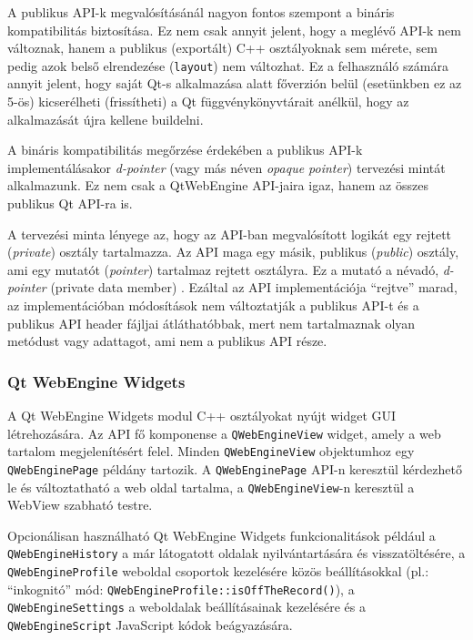 \documentclass[12pt]{report}
\begin{document}
A publikus API-k megvalósításánál nagyon fontos szempont a bináris kompatibilitás
biztosítása. Ez nem csak annyit jelent, hogy a meglévő API-k nem változnak, hanem a publikus
(exportált) C++ osztályoknak sem mérete, sem pedig azok belső elrendezése (\texttt{layout})
nem változhat. Ez a felhasználó számára annyit jelent, hogy saját Qt-s alkalmazása alatt
főverzión belül (esetünkben ez az 5-ös) kicserélheti (frissítheti) a Qt függvénykönyvtárait
anélkül, hogy az alkalmazását újra kellene buildelni.

A bináris kompatibilitás megőrzése érdekében a publikus API-k implementálásakor
\textit{d-pointer} (vagy más néven \textit{opaque pointer}) tervezési mintát alkalmazunk.
Ez nem csak a QtWebEngine API-jaira igaz, hanem az összes publikus Qt API-ra is.

A tervezési minta lényege az, hogy az API-ban megvalósított logikát egy rejtett
(\textit{private}) osztály tartalmazza. Az API maga egy másik, publikus (\textit{public})
osztály, ami egy mutatót (\textit{pointer}) tartalmaz rejtett osztályra. Ez a mutató a névadó,
\textit{d-pointer} (private data member) \cite{bib:qt-wiki-d-pointer}. Ezáltal az API
implementációja ``rejtve'' marad, az implementációban módosítások nem változtatják a publikus
API-t és a publikus API header fájljai átláthatóbbak, mert nem tartalmaznak olyan metódust
vagy adattagot, ami nem a publikus API része.

\subsubsection{Qt WebEngine Widgets}
A Qt WebEngine Widgets modul \cite{bib:qt-doc-qt-webengine-widgets} C++ osztályokat nyújt
widget GUI létrehozására. Az API fő komponense a \texttt{QWebEngineView} widget, amely a web
tartalom megjelenítésért felel. Minden \texttt{QWebEngineView} objektumhoz egy
\texttt{QWebEnginePage} példány tartozik. A \texttt{QWebEnginePage} API-n keresztül
kérdezhető le és változtatható a web oldal tartalma, a \texttt{QWebEngineView}-n keresztül a
WebView szabható testre.

Opcionálisan használható Qt WebEngine Widgets funkcionalitások például a
\texttt{QWebEngineHistory} a már látogatott oldalak nyilvántartására és visszatöltésére,
a \texttt{QWebEngineProfile} weboldal csoportok kezelésére közös beállításokkal
(pl.: ``inkognitó'' mód: \texttt{QWebEngineProfile::isOffTheRecord()}), a
\texttt{QWebEngineSettings} a weboldalak beállításainak kezelésére és a
\texttt{QWebEngineScript} JavaScript kódok beágyazására.
\end{document}
